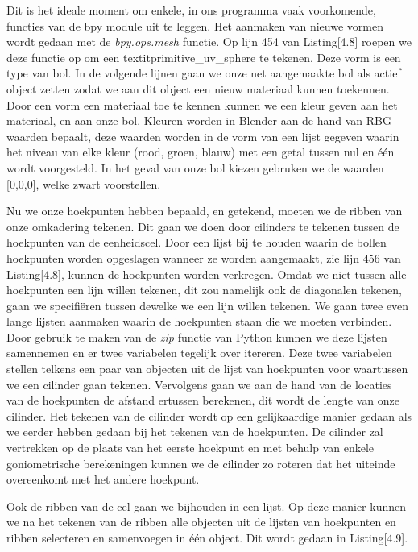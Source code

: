 Dit is het ideale moment om enkele, in ons programma vaak voorkomende, functies van de bpy module uit te leggen. Het aanmaken van nieuwe vormen wordt gedaan met de \textit{bpy.ops.mesh} functie. Op lijn 454 van Listing[4.8] roepen we deze functie op om een textit{primitive\_uv\_sphere} te tekenen. Deze vorm is een type van bol. In de volgende lijnen gaan we onze net aangemaakte bol als actief object zetten zodat we aan dit object een nieuw materiaal kunnen toekennen. Door een vorm een materiaal toe te kennen kunnen we een kleur geven aan het materiaal, en aan onze bol. Kleuren worden in Blender aan de hand van RBG-waarden bepaalt, deze waarden worden in de vorm van een lijst gegeven waarin het niveau van elke kleur (rood, groen, blauw) met een getal tussen nul en één wordt voorgesteld. In het geval van onze bol kiezen gebruken we de waarden [0,0,0], welke zwart voorstellen.
\par
Nu we onze hoekpunten hebben bepaald, en getekend, moeten we de ribben van onze omkadering tekenen. Dit gaan we doen door cilinders te tekenen tussen de hoekpunten van de eenheidscel. Door een lijst bij te houden waarin de bollen hoekpunten worden opgeslagen wanneer ze worden aangemaakt, zie lijn 456 van Listing[4.8], kunnen de hoekpunten worden verkregen. Omdat we niet tussen alle hoekpunten een lijn willen tekenen, dit zou namelijk ook de diagonalen tekenen, gaan we specifiëren tussen dewelke we een lijn willen tekenen. We gaan twee even lange lijsten aanmaken waarin de hoekpunten staan die we moeten verbinden. Door gebruik te maken van de \textit{zip} functie van Python kunnen we deze lijsten samennemen en er twee variabelen tegelijk over itereren. Deze twee variabelen stellen telkens een paar van objecten uit de lijst van hoekpunten voor waartussen we een cilinder gaan tekenen. Vervolgens gaan we aan de hand van de locaties van de hoekpunten de afstand ertussen berekenen, dit wordt de lengte van onze cilinder. Het tekenen van de cilinder wordt op een gelijkaardige manier gedaan als we eerder hebben gedaan bij het tekenen van de hoekpunten. De cilinder zal vertrekken op de plaats van het eerste hoekpunt en met behulp van enkele goniometrische berekeningen kunnen we de cilinder zo roteren dat het uiteinde overeenkomt met het andere hoekpunt.
\par



Ook de ribben van de cel gaan we bijhouden in een lijst. Op deze manier kunnen we na het tekenen van de ribben alle objecten uit de lijsten van hoekpunten en ribben selecteren en samenvoegen in één object. Dit wordt gedaan in Listing[4.9].     

